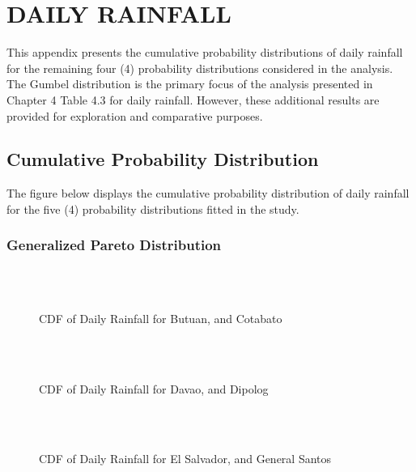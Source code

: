 \noappendicestocpagenum
\addappheadtotoc
\chapter{DAILY RAINFALL}

This appendix presents the cumulative probability distributions of daily rainfall for the remaining four (4) probability distributions considered in the analysis. The Gumbel distribution is the primary focus of the analysis presented in Chapter 4 Table 4.3 for daily rainfall. However, these additional results are provided for exploration and comparative purposes.

\section{Cumulative Probability Distribution}

The figure below displays the cumulative probability distribution of daily rainfall for the five (4) probability distributions fitted in the study.

\subsection{Generalized Pareto Distribution}

\begin{figure}[H]
  \centering
  \\
  \\
  \caption{CDF of Daily Rainfall for Butuan, and Cotabato}
  \label{fig:daily_without_threshold_appendix_gpd_pt1}
\end{figure}

\begin{figure}[H]
  \centering
  \\
  \\
  \caption{CDF of Daily Rainfall for Davao, and Dipolog}
  \label{fig:daily_without_threshold_appendix_gpd_pt2}
\end{figure}

\begin{figure}[H]
  \centering
  \\
  \\
  \caption{CDF of Daily Rainfall for El Salvador, and General Santos}
  \label{fig:daily_without_threshold_appendix_gpd_pt3}
\end{figure}

